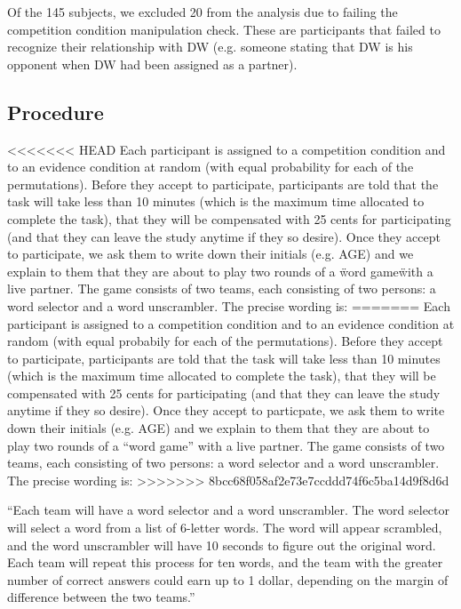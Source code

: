 \documentclass{article}
\begin{document}
Of the 145 subjects, we excluded 20 from the analysis due to failing the competition condition manipulation check. These are participants that failed to recognize their relationship with DW (e.g. someone stating that DW is his opponent when DW had been assigned as a partner).


\subsection{Procedure}

<<<<<<< HEAD
Each participant is assigned to a competition condition and to an evidence condition at random (with equal probability for each of the permutations). Before they accept to participate, participants are told that the task will take less than 10 minutes (which is the maximum time allocated to complete the task), that they will be compensated with 25 cents for participating (and that they can leave the study anytime if they so desire). Once they accept to participate, we ask them to write down their initials (e.g. AGE) and we explain to them that they are about to play two rounds of a \"word game\" with a live partner. The game consists of two teams, each consisting of two persons: a word selector and a word unscrambler. The precise wording is:
=======
Each participant is assigned to a competition condition and to an evidence condition at random (with equal probabily for each of the permutations). Before they accept to participate, participants are told that the task will take less than 10 minutes (which is the maximum time allocated to complete the task), that they will be compensated with 25 cents for participating (and that they can leave the study anytime if they so desire). Once they accept to particpate, we ask them to write down their initials (e.g. AGE) and we explain to them that they are about to play two rounds of a ``word game'' with a live partner. The game consists of two teams, each consisting of two persons: a word selector and a word unscrambler. The precise wording is:
>>>>>>> 8bcc68f058af2e73e7ccddd74f6c5ba14d9f8d6d

``Each team will have a word selector and a word unscrambler. The word selector will select a word from a list of 6-letter words. The word will appear scrambled, and the word unscrambler will have 10 seconds to figure out the original word. Each team will repeat this process for ten words, and the team with the greater number of correct answers could earn up to 1 dollar, depending on the margin of difference between the two teams.''
\end{document}
